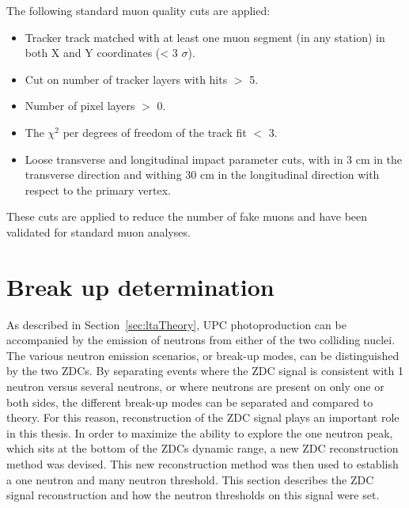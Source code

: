       The following standard muon quality cuts are applied:
      \begin{itemize}
        \item Tracker track matched with at least one muon segment 
          (in any station) in both X and Y coordinates (< 3 $\sigma$).
        \item Cut on number of tracker layers with hits $>$ 5.
        \item Number of pixel layers $>$ 0.
        \item The $\chi^{2}$ per degrees of freedom of the track fit $<$ 3. 
        \item Loose transverse and longitudinal impact parameter cuts, with in 3 
          cm in the transverse direction and withing 30 cm in the longitudinal 
          direction with respect to the primary vertex.
      \end{itemize}
      These cuts are applied to reduce the number of fake muons and have been 
        validated for standard muon analyses.

  \section{\label{sec:breakUpDet} Break up determination}
    As described in Section~\ref{sec:ltaTheory}, UPC \JPsi{} photoproduction 
      can be accompanied by the emission of neutrons from either of the two 
      colliding nuclei.
    The various neutron emission scenarios, or break-up modes, can 
      be distinguished by the two ZDCs.
    By separating events where the ZDC signal is consistent with 1 neutron 
      versus several neutrons, or where neutrons are present on only one or 
      both sides, the different break-up modes can be separated
      and compared to theory. 
    For this reason, reconstruction of the ZDC signal plays an important role 
      in this thesis. 
    In order to maximize the ability to explore the one neutron peak, which 
      sits at the bottom of the ZDCs dynamic range, a new ZDC reconstruction 
      method was devised. 
    This new reconstruction method was then used to establish a one neutron and
      many neutron threshold.
    This section describes the ZDC signal reconstruction and how the neutron 
      thresholds on this signal were set.
    
